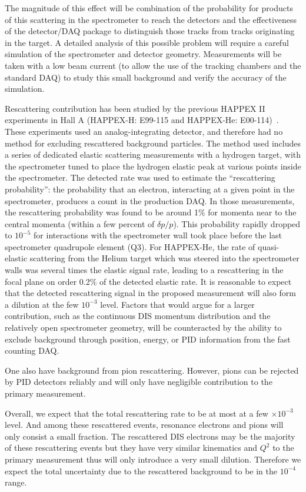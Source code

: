 The magnitude of this effect will be combination of the
probability for products of this scattering in the spectrometer to
reach the detectors and the effectiveness of the 
detector/DAQ package to distinguish those tracks from tracks 
originating in the target.  A detailed analysis of this possible 
problem will require a careful simulation of the spectrometer and 
detector geometry.  Measurements will be taken
with a low beam current (to allow the use of the tracking
chambers and the standard DAQ) to study this small background and
verify the accuracy of the simulation.

Rescattering contribution has been studied by the previous HAPPEX II experiments
in Hall A (HAPPEX-H: E99-115 and HAPPEX-He: E00-114)~\cite{HAPPEX-2005}. 
These experiments used an analog-integrating detector, and therefore 
had no method for excluding rescattered background particles. The method used 
includes a series of dedicated elastic scattering measurements with a hydrogen target, 
with the spectrometer tuned to place the hydrogen elastic peak at various points inside 
the spectrometer.  The detected rate was used to estimate the 
``rescattering probability'': the probability that an electron, 
interacting at a given point in the spectrometer, 
produces a count in the production DAQ. 
In those measurements, the rescattering probability was found to be around 1\% 
for momenta near to the central momenta (within a few percent of 
$\delta p/p$). This probability rapidly dropped to $10^{-5}$ for 
interactions with the spectrometer wall took place before the last 
spectrometer quadrupole element (Q3). For HAPPEX-He, the rate of 
quasi-elastic scattering from the Helium target which was steered 
into the spectrometer walls was several times the elastic
signal rate, leading to a rescattering in the focal plane on order 0.2\% of the
detected elastic rate. It is reasonable to expect that the detected 
rescattering signal in the proposed measurement will also form a dilution 
at the few $10^{-3}$ level. Factors that would argue for a larger contribution, 
such as the continuous DIS momentum distribution and the relatively open 
spectrometer geometry, will be counteracted by the ability to exclude 
background through position, energy, or PID information from the fast 
counting DAQ. 

One also have background from pion rescattering. 
However, pions can be rejected by PID detectors reliably and will only have
negligible contribution to the primary measurement. 

Overall, we expect that the total rescattering rate to be at most at a few 
$\times 10^{-3}$ level. And among these rescattered events, resonance 
electrons and pions will only consist a small fraction. The rescattered
DIS electrons may be the majority of these rescattering events but they have 
very similar kinematics and $Q^2$ to the primary measurement thus will only 
introduce a very small 
dilution. Therefore we expect the total uncertainty due
to the rescattered background to be in the $10^{-4}$ range.
